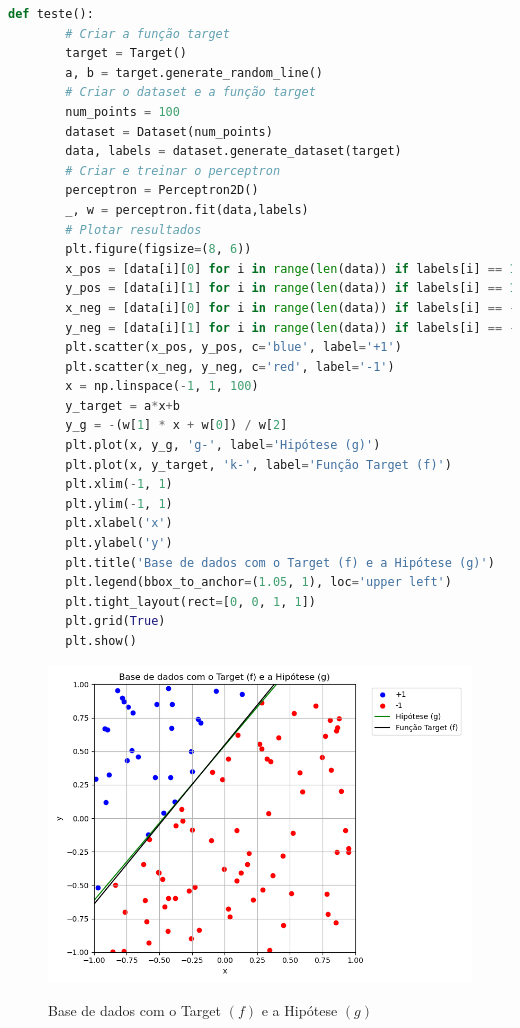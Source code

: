 \begin{lstlisting}[language=Python, caption=Teste das classes, label=cod:perceptron_teste]
    def teste():
        # Criar a função target
        target = Target()
        a, b = target.generate_random_line()
        # Criar o dataset e a função target
        num_points = 100
        dataset = Dataset(num_points)
        data, labels = dataset.generate_dataset(target)
        # Criar e treinar o perceptron
        perceptron = Perceptron2D()
        _, w = perceptron.fit(data,labels)
        # Plotar resultados
        plt.figure(figsize=(8, 6))
        x_pos = [data[i][0] for i in range(len(data)) if labels[i] == 1]
        y_pos = [data[i][1] for i in range(len(data)) if labels[i] == 1]
        x_neg = [data[i][0] for i in range(len(data)) if labels[i] == -1]
        y_neg = [data[i][1] for i in range(len(data)) if labels[i] == -1]
        plt.scatter(x_pos, y_pos, c='blue', label='+1')
        plt.scatter(x_neg, y_neg, c='red', label='-1')
        x = np.linspace(-1, 1, 100)
        y_target = a*x+b
        y_g = -(w[1] * x + w[0]) / w[2]
        plt.plot(x, y_g, 'g-', label='Hipótese (g)')
        plt.plot(x, y_target, 'k-', label='Função Target (f)')
        plt.xlim(-1, 1)
        plt.ylim(-1, 1)
        plt.xlabel('x')
        plt.ylabel('y')
        plt.title('Base de dados com o Target (f) e a Hipótese (g)')
        plt.legend(bbox_to_anchor=(1.05, 1), loc='upper left')
        plt.tight_layout(rect=[0, 0, 1, 1])
        plt.grid(True)
        plt.show()
\end{lstlisting}

\begin{figure}[H]
    \caption{Base de dados com o Target $(f)$ e a Hipótese $(g)$}
       \centering
       \includegraphics[width=\textwidth]{perceptron_plot.png}
    \label{fig:perceptron_plot}
\end{figure}

